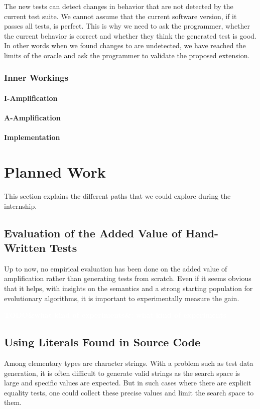 \documentclass[11pt]{sdm}
\newcommand{\todo}[1]{\colorbox{Red!75}{\textcolor{white}{\textbf{TODO\ifx&#1&\else: #1\fi}}}}
\begin{document}
The new tests can detect changes in behavior that are not detected by the current test suite.
We cannot assume that the current software version, if it passes all tests, is perfect.
This is why we need to ask the programmer, whether the current behavior is correct and whether they think the generated test is good.
In other words when we found changes to are undetected, we have reached the limits of the oracle and ask the programmer to validate the proposed extension.

\subsubsection{Inner Workings}

\paragraph{I-Amplification}

\paragraph{A-Amplification}

\paragraph{Implementation}

\cite{pawlak2016spoon}


\section{Planned Work}
\label{planned}
This section explains the different paths that we could explore during the internship.

\subsection{Evaluation of the Added Value of Hand-Written Tests}
\label{evaluation}
Up to now, no empirical evaluation has been done on the added value of amplification rather than generating tests from scratch.
Even if it seems obvious that it helps, with insights on the semantics and a strong starting population for evolutionary algorithms, it is important to experimentally measure the gain.

\todo{what kind of experiments}

\subsection{Using Literals Found in Source Code}
\label{mutation}
Among elementary types are character strings.
With a problem such as test data generation, it is often difficult to generate valid strings as the search space is large and specific values are expected.
But in such cases where there are explicit equality tests, one could collect these precise values and limit the search space to them.
\end{document}
